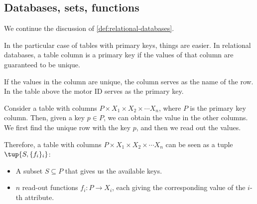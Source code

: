 \label{sec:specialization}

\subsection{Databases, sets, functions}

We continue the discussion of \cref{def:relational-databases}.

In the particular case of tables with primary keys,
things are easier. In relational databases, 
a table column is a primary key if the values of that column are guaranteed to be unique.

If the values in the column are unique, the column serves as the name of the row. In the table 
above the motor ID serves as the primary key.

Consider a table with columns $P \times X_1 \times X_2 \times \cdots X_n$,
where $P$ is the primary key column. Then, given a key $p \in P$,
we can obtain the value in the other columns. We first find the unique
row with the key $p$, and then we read out the values. 

Therefore, a table with columns $P \times X_1 \times X_2 \times \cdots X_n$
can be seen as a tuple $\tup{S, \{f_i\}_i}$:
\begin{itemize}
    \item A subset $S \subseteq P$ that gives us the available keys.
    \item $n$ read-out functions $f_i: P \to X_i$, each giving the 
    corresponding value of the $i$-th attribute.
\end{itemize}




\begin{comment}
\begin{table}[h]
    \centering
    \begin{tabular}{c|c|c|c|c|c}
         Motor ID & Company& Size & \unit[Weight]{[g]} & \unit[Max Power]{[W]} & \unit[price]{[USD]} \\
         \hline
         $\textsf{Model1}$&Company $\textsf{B}$ & 2 x 3 x 4& 10 & &259\\
         $\textsf{Model2}$&Company $\textsf{A}$ &2 x 3 x 4& 20 & &109\\
         $\textsf{Model3}$&Company $\textsf{B}$ &2 x 3 x 4& 5 & &124\\
         $\textsf{Model4}$&Company $\textsf{C}$ &2 x 3 x 4& 30 & &399\\
         $\textsf{Model5}$&Company $\textsf{A}$ &2 x 3 x 4& 45 & &245  \\
        $\textsf{Model6}$&Company $\textsf{D}$ & 2 x 3 x 4& 20 & &89\\
        $\textsf{Model7}$&Company $\textsf{B}$ & 2 x 3 x 4& 15 &&130
    \end{tabular}
    \caption{A simplified catalogue of motors.}
    \label{tab:electric_motors}
\end{table}
\end{comment}


